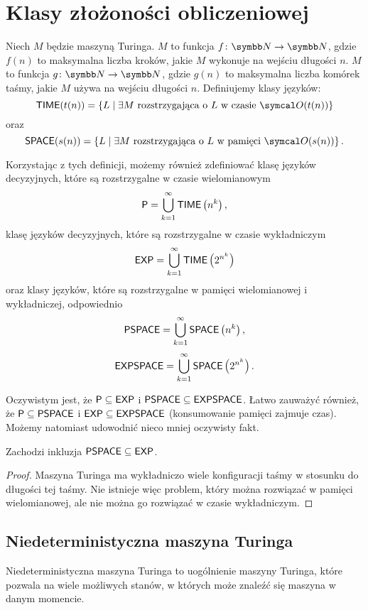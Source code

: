 \section{Klasy złożoności obliczeniowej}

Niech $M$ będzie maszyną Turinga.  $M$ to funkcja $f\colon \NN \to \NN$, gdzie $f(n)$ to maksymalna liczba kroków, jakie $M$ wykonuje na wejściu długości $n$.  $M$ to funkcja $g\colon \NN \to \NN$, gdzie $g(n)$ to maksymalna liczba komórek taśmy, jakie $M$ używa na wejściu długości $n$. Definiujemy klasy języków:
\[ \TIME(t(n)) = \left\{ L \mid \exists M \text{ rozstrzygająca o } L \text{ w czasie } \sO(t(n)) \right\} \]
oraz
\[ \SPACE(s(n)) = \left\{ L \mid \exists M \text{ rozstrzygająca o } L \text{ w pamięci } \sO(s(n)) \right\}. \]

Korzystając z tych definicji, możemy również zdefiniować klasę języków decyzyjnych, które są rozstrzygalne w czasie wielomianowym
\[ \textsf{P} = \bigcup_{k = 1}^\infty \textsf{TIME}\left(n^k\right), \]
klasę języków decyzyjnych, które są rozstrzygalne w czasie wykładniczym
\[ \textsf{EXP} = \bigcup_{k = 1}^\infty \textsf{TIME}\left(2^{n^k}\right) \]
oraz klasy języków, które są rozstrzygalne w pamięci wielomianowej i wykładniczej, odpowiednio
\[ \textsf{PSPACE} = \bigcup_{k = 1}^\infty \textsf{SPACE}\left(n^k\right), \]
\[ \textsf{EXPSPACE} = \bigcup_{k = 1}^\infty \textsf{SPACE}\left(2^{n^k}\right). \]

Oczywistym jest, że $\textsf{P} \subseteq \textsf{EXP}$ i $\textsf{PSPACE} \subseteq \textsf{EXPSPACE}$. Łatwo zauważyć również, że $\textsf{P} \subseteq \textsf{PSPACE}$ i $\textsf{EXP} \subseteq \textsf{EXPSPACE}$ (konsumowanie pamięci zajmuje czas). Możemy natomiast udowodnić nieco mniej oczywisty fakt.
\begin{fact}
    Zachodzi inkluzja $\textsf{PSPACE} \subseteq \textsf{EXP}$.
\end{fact}
\begin{proof}
    Maszyna Turinga ma wykładniczo wiele konfiguracji taśmy w stosunku do długości tej taśmy. Nie istnieje więc problem, który można rozwiązać w pamięci wielomianowej, ale nie można go rozwiązać w czasie wykładniczym.
\end{proof}

\subsection{Niedeterministyczna maszyna Turinga}

Niedeterministyczna maszyna Turinga to uogólnienie maszyny Turinga, które pozwala na wiele możliwych stanów, w których może znaleźć się maszyna w danym momencie.

